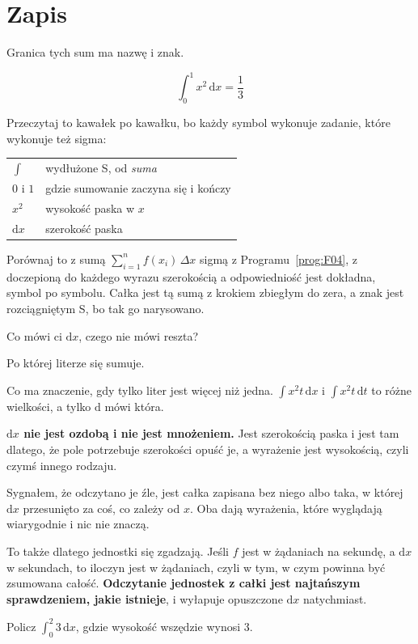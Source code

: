 \section{Zapis}
\label{sec:F13-notation}

\begin{fr}
Granica tych sum ma nazwę i znak.

\[ \int_{0}^{1} x^{2}\,\mathrm{d}x = \frac{1}{3} \]

Przeczytaj to kawałek po kawałku, bo każdy symbol wykonuje zadanie, które
wykonuje też sigma:

\begin{center}
\begin{tabular}{ll}
\toprule
$\int$ & wydłużone S, od \emph{suma} \\
$0$ i $1$ & gdzie sumowanie zaczyna się i kończy \\
$x^{2}$ & wysokość paska w $x$ \\
$\mathrm{d}x$ & szerokość paska \\
\bottomrule
\end{tabular}
\end{center}

Porównaj to z sumą $\sum_{i=1}^{n} f(x_i)\,\Delta x$ \dash{} sigmą z
Programu~\ref{prog:F04}, z doczepioną do każdego wyrazu szerokością \dash{} a
odpowiedniość jest dokładna, symbol po symbolu. Całka jest tą sumą z krokiem
zbiegłym do zera, a znak jest rozciągniętym S, bo tak go narysowano.

Co mówi ci $\mathrm{d}x$, czego nie mówi reszta?
\nextframe
\end{fr}

\begin{fr}
\begin{ansblock}
Po której literze się sumuje.
\end{ansblock}

Co ma znaczenie, gdy tylko liter jest więcej niż jedna.
$\int x^{2}t\,\mathrm{d}x$ i $\int x^{2}t\,\mathrm{d}t$ to różne wielkości, a
tylko $\mathrm{d}$ mówi która.

\begin{trapbox}
\textbf{$\mathrm{d}x$ nie jest ozdobą i nie jest mnożeniem.} Jest szerokością
paska i jest tam dlatego, że pole potrzebuje szerokości \dash{} opuść je, a
wyrażenie jest wysokością, czyli czymś innego rodzaju.

Sygnałem, że odczytano je źle, jest całka zapisana bez niego albo taka, w
której $\mathrm{d}x$ przesunięto za coś, co zależy od $x$. Oba dają wyrażenia,
które wyglądają wiarygodnie i nic nie znaczą.

To także dlatego jednostki się zgadzają. Jeśli $f$ jest w żądaniach na
sekundę, a $\mathrm{d}x$ w sekundach, to iloczyn jest w żądaniach, czyli w tym,
w czym powinna być zsumowana całość. \textbf{Odczytanie jednostek z całki jest
najtańszym sprawdzeniem, jakie istnieje}, i wyłapuje opuszczone $\mathrm{d}x$
natychmiast.
\end{trapbox}

Policz $\int_{0}^{2} 3\,\mathrm{d}x$, gdzie wysokość wszędzie wynosi $3$.
\nextframe
\end{fr}


